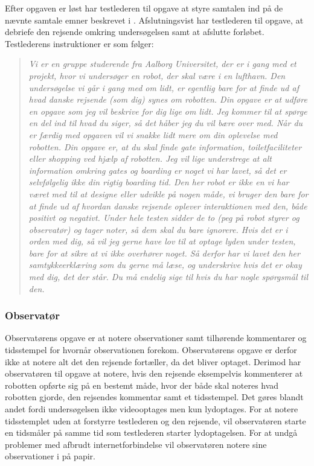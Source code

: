Efter opgaven er løst har testlederen til opgave at styre samtalen ind på de nævnte samtale emner beskrevet i . Afslutningsvist har testlederen til opgave, at debriefe den rejsende omkring undersøgelsen samt at afslutte forløbet.\blankline
%
Testlederens instruktioner er som følger:
%
\begin{quotation}
\noindent
\textit{Vi er en gruppe studerende fra Aalborg Universitet, der er i gang med et projekt, hvor vi undersøger en robot, der skal være i en lufthavn. Den undersøgelse vi går i gang med om lidt, er egentlig bare for at finde ud af hvad danske rejsende (som dig) synes om robotten.\blankline
%
Din opgave er at udføre en opgave som jeg vil beskrive for dig lige om lidt. Jeg kommer til at spørge en del ind til hvad du siger, så det håber jeg du vil bære over med. Når du er færdig med opgaven vil vi snakke lidt mere om din oplevelse med robotten.\blankline  
%
Din opgave er, at du skal finde gate information, toiletfaciliteter eller shopping ved hjælp af robotten. Jeg vil lige understrege at alt information omkring gates og boarding er noget vi har lavet, så det er selvfølgelig ikke din rigtig boarding tid.\blankline 
%
Den her robot er ikke en vi har været med til at designe eller udvikle på nogen måde, vi bruger den bare for at finde ud af hvordan danske rejsende oplever interaktionen med den, både positivt og negativt.\blankline
%
Under hele testen sidder de to (peg på robot styrer og observatør) og tager noter, så dem skal du bare ignorere. \blankline
%
Hvis det er i orden med dig, så vil jeg gerne have lov til at optage lyden under testen, bare for at sikre at vi ikke overhører noget. Så derfor har vi lavet den her samtykkeerklæring som du gerne må læse, og underskrive hvis det er okay med dig, det der står. Du må endelig sige til hvis du har nogle spørgsmål til den.}
\end{quotation}
   

\subsubsection*{Observatør}
Observatørens opgave er at notere observationer samt tilhørende kommentarer og tidsstempel for hvornår observationen forekom. Observatørens opgave er derfor ikke at notere alt det den rejsende fortæller, da det bliver optaget. Derimod har observatøren til opgave at notere, hvis den rejsende eksempelvis kommenterer at robotten opførte sig på en bestemt måde, hvor der både skal noteres hvad robotten gjorde, den rejsendes kommentar samt et tidsstempel. Det gøres blandt andet fordi undersøgelsen ikke videooptages men kun lydoptages. For at notere tidsstemplet uden at forstyrre testlederen og den rejsende, vil observatøren starte en tidsmåler på samme tid som testlederen starter lydoptagelsen. For at undgå problemer med afbrudt internetforbindelse vil observatøren notere sine observationer i på papir.      
 
